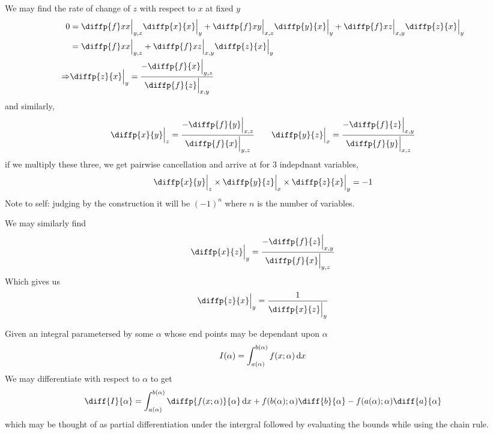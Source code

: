 \documentclass{article}
\begin{document}
\begin{cor}
    We may find the rate of change of $z$ with respect to $x$ at fixed $y$
    \begin{align*}
        0 &= \diffp{f}x{x}\Big{|}_{y,z} \diffp{x}{x}\Big{|}_{y} + \diffp{f}x{y}\Big{|}_{x,z} \diffp{y}{x}\Big{|}_{y} + \diffp{f}x{z}\Big{|}_{x,y} \diffp{z}{x}\Big{|}_{y} \\
        &= \diffp{f}x{x}\Big{|}_{y,z} + \diffp{f}x{z}\Big{|}_{x,y} \diffp{z}{x}\Big{|}_{y} \\
        \Rightarrow& \diffp{z}{x}\Big{|}_{y} = \frac{-\diffp{f}{x}\Big{|}_{y,z}}{\diffp{f}{z}\Big{|}_{x,y}}
    \end{align*}
    and similarly,
    \[
        \diffp{x}{y}\Big{|}_{z} = \frac{-\diffp{f}{y}\Big{|}_{x,z}}{\diffp{f}{x}\Big{|}_{y, z}} \qquad \diffp{y}{z}\Big{|}_{x} = \frac{-\diffp{f}{z}\Big{|}_{x,y}}{\diffp{f}{y}\Big{|}_{x,z}}
    \]
    if we multiply these three, we get pairwise cancellation and arrive at for 3 indepdnant variables,
    \[
        \diffp{x}{y}\Big{|}_{z} \times \diffp{y}{z}\Big{|}_{x} \times \diffp{z}{x}\Big{|}_{y} = -1
    \]
    Note to self: judging by the construction it will be $(-1)^n$ where $n$ is the number of variables.
\end{cor}

\begin{defi}
    We may similarly find
    \[
        \diffp{x}{z}\Big{|}_{y} = \frac{-\diffp{f}{z}\Big{|}_{x,y}}{\diffp{f}{x}\Big{|}_{y,z}}
    \]
    Which gives us
    \[
        \diffp{z}{x}\Big{|}_{y} = \frac{1}{\diffp{x}{z}\Big{|}_{y}}
    \]
\end{defi}

\begin{thm}
    Given an integral parametersed by some $\alpha$ whose end points may be dependant upon $\alpha$
    \[
        I(\alpha) = \int_{a(\alpha)}^{b(\alpha)}{f(x ; \alpha) \mathop{}\!\mathrm{d} x}
    \]
    We may differentiate with respect to $\alpha$ to get
    \[
        \diff{I}{\alpha} = \int_{a(\alpha)}^{b(\alpha)}{\diffp{f(x ; \alpha)}{\alpha} \diffd x} + f(b(\alpha); \alpha) \diff{b}{\alpha} - f(a(\alpha); \alpha) \diff{a}{\alpha}
    \]
    which may be thought of as partial differentiation under the intergral followed by evaluating the bounds while using the chain rule. 
\end{thm}
\end{document}
